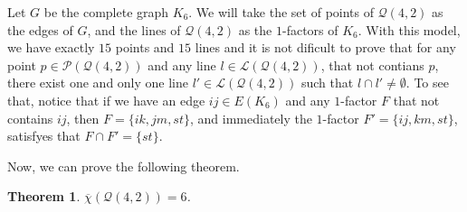 \documentclass[12pt]{article}
\newtheorem{theorem}{Theorem}[section]
\begin{document}
Let $G$ be the complete graph $K_6$. We will take the set of points of $\mathcal{Q}(4,2)$ as the edges of $G$, and the lines of $\mathcal{Q}(4,2)$ as the $1$-factors of $K_6$. 
With this model, we have exactly $15$ points and $15$ lines and it is not dificult to prove that for any point $p\in \mathcal{P}(\mathcal{Q}(4,2))$ and any line $l\in \mathcal{L}(\mathcal{Q}(4,2))$, that not contians $p$, there exist one and only one line $l'\in \mathcal{L}(\mathcal{Q}(4,2))$ such that $l\cap l'\not = \emptyset$. To see that, notice that if we have an edge $ij\in E(K_6)$ and any $1$-factor $F$ that not contains $ij$, then $F=\{ik,jm,st\}$, and immediately the $1$-factor $F'=\{ij, km, st\}$, satisfyes that $F \cap F'=\{st\} $. 

Now, we can prove the following theorem.

\begin{theorem}\label{thm:Q42}
$\overline{\chi}(\mathcal{Q}(4,2)) = 6$.
\end{theorem}
\end{document}
